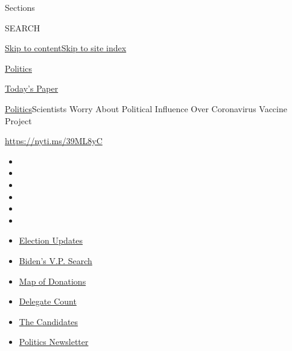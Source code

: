 Sections

SEARCH

\protect\hyperlink{site-content}{Skip to
content}\protect\hyperlink{site-index}{Skip to site index}

\href{https://www.nytimes.com/section/politics}{Politics}

\href{https://myaccount.nytimes.com/auth/login?response_type=cookie\&client_id=vi}{}

\href{https://www.nytimes.com/section/todayspaper}{Today's Paper}

\href{/section/politics}{Politics}\textbar{}Scientists Worry About
Political Influence Over Coronavirus Vaccine Project

\url{https://nyti.ms/39ML8yC}

\begin{itemize}
\item
\item
\item
\item
\item
\item
\end{itemize}

\begin{itemize}
\item
  \href{https://www.nytimes.com/2020/08/04/us/elections/primary-election-michigan-arizona-kansas.html?action=click\&pgtype=Article\&state=default\&region=TOP_BANNER\&context=storylines_menu}{Election
  Updates}
\item
  \href{https://www.nytimes.com/article/biden-vice-president-2020.html?action=click\&pgtype=Article\&state=default\&region=TOP_BANNER\&context=storylines_menu}{Biden's
  V.P. Search}
\item
  \href{https://www.nytimes.com/interactive/2020/07/24/us/politics/trump-biden-campaign-donors.html?action=click\&pgtype=Article\&state=default\&region=TOP_BANNER\&context=storylines_menu}{Map
  of Donations}
\item
  \href{https://www.nytimes.com/interactive/2020/us/elections/delegate-count-primary-results.html?action=click\&pgtype=Article\&state=default\&region=TOP_BANNER\&context=storylines_menu}{Delegate
  Count}
\item
  \href{https://www.nytimes.com/interactive/2019/us/politics/2020-presidential-candidates.html?action=click\&pgtype=Article\&state=default\&region=TOP_BANNER\&context=storylines_menu}{The
  Candidates}
\item
  \href{https://www.nytimes.com/newsletters/politics?action=click\&pgtype=Article\&state=default\&region=TOP_BANNER\&context=storylines_menu}{Politics
  Newsletter}
\end{itemize}

